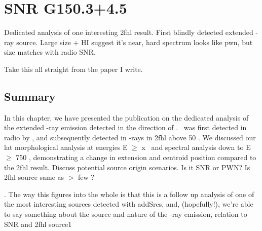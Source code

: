 \chapter{SNR G150.3+4.5}
\label{chap:G150}
Dedicated analysis  of one interesting \gls{2fhl} result. First blindly detected extended \g -ray source. Large size  + HI suggest it's near, hard spectrum looks like pwn, but size matches with radio SNR.

Take this all straight from the paper I write.


\section{\label{G150:summ}Summary} In this chapter, we have presented the publication on the dedicated analysis of the extended \g -ray emission detected in the direction of \gone. \gone ~was first detected in radio by \cite{Gao14}, and subsequently detected in \g-rays in \gls{2fhl} above 50 \gev. We discussed our \gls{lat} morphological analysis at energies E $\geq$ x \gev~and spectral analysis down to E $\geq$ 750 \mev, demonstrating a change in extension and centroid position compared to the \gls{2fhl} result. Discuss potential source origin scenarios. Is it SNR or PWN? Is \gls{2fhl} source same as $>$ few \gev? 

. The way this figures into the whole is that  this is a follow up analysis of one of the most interesting  sources detected with addSrcs, and, (hopefully!), we're able to say something about the source and nature of the \g-ray emission, relation to SNR and \gls{2fhl} source1